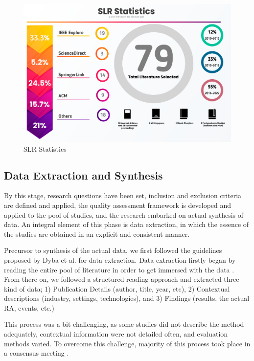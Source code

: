 \documentclass{ieeeaccess}
\begin{document}
\begin{figure}[t]
    \includegraphics[width=18cm]{Media/databases-statitistic-[Recovered].png}
    \caption{SLR Statistics}
    \label{fig:SLRStats}
\end{figure}

\subsection{Data Extraction and Synthesis}

By this stage, research questions have been set, inclusion and exclusion criteria are defined and applied, the quality assessment framework is developed and applied to the pool of studies, and the research embarked on actual synthesis of data. An integral element of this phase is data extraction, in which the essence of the studies are obtained in an explicit and consistent manner.

Precursor to synthesis of the actual data, we first followed the guidelines proposed by Dyba et al. \cite{cruzes2011recommended} for data extraction. Data extraction firstly began by reading the entire pool of literature in order to get immersed with the data \cite{braun2006using}. From there on, we followed a structured reading approach and extracted three kind of data; 1) Publication Details (author, title, year, etc), 2) Contextual descriptions (industry, settings, technologies), and 3) Findings (results, the actual RA, events, etc.)

This process was a bit challenging, as some studies did not describe the method adequately, contextual information were not detailed often, and evaluation methods varied. To overcome this challenge, majority of this process took place in a consensus meeting \cite{dyba2007applying}.
\end{document}
